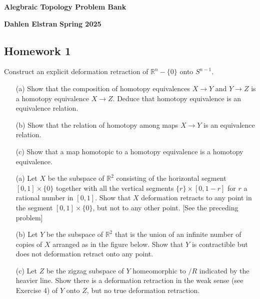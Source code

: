 \documentclass[12pt]{article}
\newcommand{\R}{\mathbb{R}}
\begin{document}
\begin{newtitle}
  \begin{center}
    \textbf{\Huge Alegbraic Topology Problem Bank}
  \end{center}
  \textbf{Dahlen Elstran} \hfill \textbf{Spring 2025}
\end{newtitle}

\begin{center} \section*{Homework 1} \end{center}

\begin{hatcher}[0.2]
    Construct an explicit deformation retraction of $\mathbb{R}^n - \{0\}$ onto $S^{n-1}$.
\end{hatcher}

\begin{hatcher}[0.3]
    \begin{itemize}
        \item[(a)] Show that the composition of homotopy equivalences $X \to Y$ and $Y \to Z$ is a homotopy equivalence $X \to Z$. Deduce that homotopy equivalence is an equivalence relation.

        \item[(b)] Show that the relation of homotopy among maps $X \to Y$ is an equivalence relation.

        \item[(c)] Show that a map homotopic to a homotopy equivalence is a homotopy equivalence.
    \end{itemize}
\end{hatcher}

\begin{hatcher}[0.6]
  \begin{itemize}
    \item[(a)] Let $X$ be the subspace of $\R^2$ consisting of the horizontal segment $[0,1] \times \{0\}$ 
      together with all the vertical segments $\{r\} \times [0,1-r]$ for $r$ a rational number in 
      $[0,1]$. Show that $X$ deformation retracts to any point in the segment $[0,1] \times \{ 0\}$, but
      not to any other point. [See the preceding problem]
    \item[(b)] Let $Y$ be the subspace of $\R^2$ that is the union of an infinite number of copies of $X$ 
      arranged as in the figure below. Show that $Y$ is contractible but does not deformation retract 
      onto any point. 
    \item[(c)] Let $Z$ be the zigzag subspace of $Y$ homeomorphic to $/R$ indicated by the heavier line. 
      Show there is a deformation retraction in the weak sense (see Exercise 4) of $Y$ onto $Z$, but no true 
      deformation retraction.
  \end{itemize}
\end{hatcher}
\end{document}
